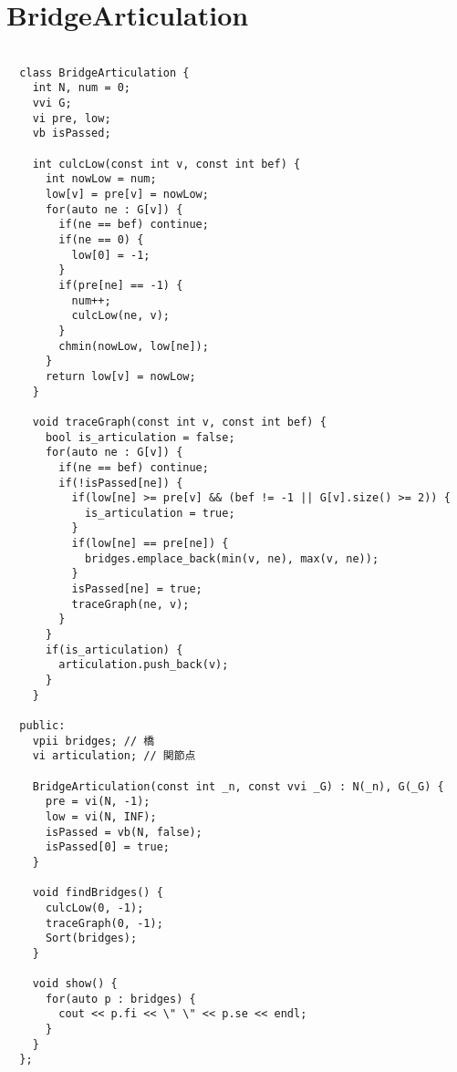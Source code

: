\documentclass{jsarticle}
\begin{document}
\color{white}
\section{BridgeArticulation}
\color{black}
\begin{lstlisting}[caption=BridgeArticulation]

  class BridgeArticulation {
    int N, num = 0;
    vvi G;
    vi pre, low;
    vb isPassed;
  
    int culcLow(const int v, const int bef) {
      int nowLow = num;
      low[v] = pre[v] = nowLow;
      for(auto ne : G[v]) {
        if(ne == bef) continue;
        if(ne == 0) {
          low[0] = -1;
        }
        if(pre[ne] == -1) {
          num++;
          culcLow(ne, v);
        }
        chmin(nowLow, low[ne]);
      }
      return low[v] = nowLow;
    }
  
    void traceGraph(const int v, const int bef) {
      bool is_articulation = false;
      for(auto ne : G[v]) {
        if(ne == bef) continue;
        if(!isPassed[ne]) {
          if(low[ne] >= pre[v] && (bef != -1 || G[v].size() >= 2)) {
            is_articulation = true;
          }
          if(low[ne] == pre[ne]) {
            bridges.emplace_back(min(v, ne), max(v, ne));
          }
          isPassed[ne] = true;
          traceGraph(ne, v);
        }
      }
      if(is_articulation) {
        articulation.push_back(v);
      }
    }
  
  public:
    vpii bridges; // 橋
    vi articulation; // 関節点
  
    BridgeArticulation(const int _n, const vvi _G) : N(_n), G(_G) {
      pre = vi(N, -1);
      low = vi(N, INF);
      isPassed = vb(N, false);
      isPassed[0] = true;
    }
  
    void findBridges() {
      culcLow(0, -1);
      traceGraph(0, -1);
      Sort(bridges);
    }
  
    void show() {
      for(auto p : bridges) {
        cout << p.fi << \" \" << p.se << endl; 
      }
    }
  };
  

\end{lstlisting}

\color{white}
\end{document}
